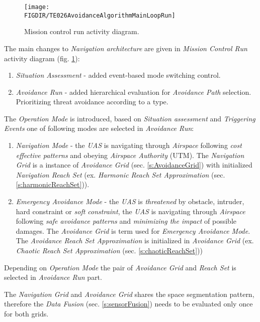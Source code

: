 \begin{figure}[H]
    \centering
    \texttt{[image: \\FIGDIR/TE026AvoidanceAlgorithmMainLoopRun]}
    \caption{Mission control run activity diagram.}
    \label{fig:missionControlRunActivityDiagram}
\end{figure}

\noindent The main changes to \emph{Navigation architecture} are given in \emph{Mission Control Run} activity diagram (fig. \ref{fig:missionControlRunActivityDiagram}):

\begin{enumerate}
    \item \emph{Situation Assessment} - added event-based mode switching control. 
   
    \item \emph{Avoidance Run} - added hierarchical evaluation for \emph{Avoidance Path} selection. Prioritizing threat avoidance according to a type. 
\end{enumerate}

\noindent The \emph{Operation Mode} is introduced, based on \emph{Situation assessment} and \emph{Triggering Events} one of following modes are selected in \emph{Avoidance Run}:

\begin{enumerate}
    \item \emph{Navigation Mode} - the \emph{UAS} is navigating through \emph{Airspace} following \emph{cost effective patterns} and obeying \emph{Airspace Authority} (UTM). The \emph{Navigation Grid} is a instance of \emph{Avoidance Grid} (sec. \ref{s:AvoidanceGrid}) with initialized \emph{Navigation Reach Set} (ex. \emph{Harmonic Reach Set Approximation} (sec. \ref{s:harmonicReachSet})).
    
    \item \emph{Emergency Avoidance Mode} - the \emph{UAS} is \emph{threatened} by obstacle, intruder, hard constraint or \emph{soft constraint}, the \emph{UAS} is navigating through \emph{Airspace} following \emph{safe avoidance patterns} and \emph{minimizing the impact} of possible damages. The \emph{Avoidance Grid} is term used for \emph{Emergency Avoidance Mode}. The \emph{Avoidance Reach Set Approximation} is initialized in \emph{Avoidance Grid} (ex. \emph{Chaotic Reach Set Approximation} (sec. \ref{s:chaoticReachSet}))
\end{enumerate}

\begin{note}
    Depending on \emph{Operation Mode} the pair of \emph{Avoidance Grid} and \emph{Reach Set} is selected in \emph{Avoidance Run} part.
    
    
    The \emph{Navigation Grid} and \emph{Avoidance Grid} shares the space segmentation pattern, therefore the \emph{Data Fusion} (sec. \ref{s:sensorFusion}) needs to be evaluated only once for both grids. 
\end{note}



